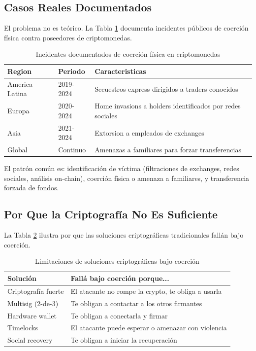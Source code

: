 \documentclass[12pt,a4paper,twoside]{book}
\begin{document}
\subsection{Casos Reales Documentados}

El problema no es teórico. La Tabla \ref{tab:casos_coerción} documenta incidentes públicos de coerción física contra poseedores de criptomonedas.

\begin{table}[h]
\centering
\caption{Incidentes documentados de coerción física en criptomonedas}
\label{tab:casos_coerción}
\begin{tabular}{p{2.5cm}p{3cm}p{7cm}}
\toprule
\textbf{Region} & \textbf{Periodo} & \textbf{Caracteristicas} \\
\midrule
America Latina & 2019-2024 & Secuestros express dirigidos a traders conocidos \\
Europa & 2020-2024 & Home invasions a holders identificados por redes sociales \\
Asia & 2021-2024 & Extorsion a empleados de exchanges \\
Global & Continuo & Amenazas a familiares para forzar transferencias \\
\bottomrule
\end{tabular}
\end{table}

El patrón común es: identificación de víctima (filtraciones de exchanges, redes sociales, análisis on-chain), coerción física o amenaza a familiares, y transferencia forzada de fondos.

\subsection{Por Que la Criptografía No Es Suficiente}

La Tabla \ref{tab:crypto_vs_coerción} ilustra por que las soluciones criptográficas tradicionales fallán bajo coerción.

\begin{table}[h]
\centering
\caption{Limitaciones de soluciones criptográficas bajo coerción}
\label{tab:crypto_vs_coerción}
\begin{tabular}{p{3.5cm}p{9cm}}
\toprule
\textbf{Solución} & \textbf{Fallá bajo coerción porque...} \\
\midrule
Criptografía fuerte & El atacante no rompe la crypto, te obliga a usarla \\
Multisig (2-de-3) & Te obligan a contactar a los otros firmantes \\
Hardware wallet & Te obligan a conectarla y firmar \\
Timelocks & El atacante puede esperar o amenazar con violencia \\
Social recovery & Te obligan a iniciar la recuperación \\
\bottomrule
\end{tabular}
\end{table}
\end{document}
